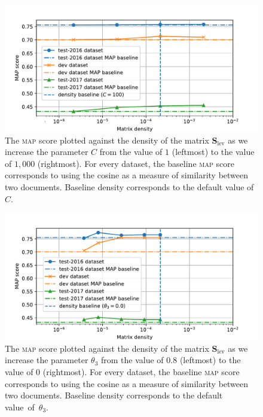 \documentclass[
  digital, %
  notable, %
  lof,     %
  lot,     %
  nopalatino, color
]{fithesis3}
\def\abbr#1{\textsc{\MakeLowercase{#1}}}
\begin{document}
\begin{figure}[p]
\centering%
\includegraphics[trim={0.6cm 0.1cm 1.5cm 1.0cm}, scale=0.75]{figs/fig4}
\caption[A \abbr{MAP}-density plot for matrix $\mathbf S_{\textrm{lev}}$
and parameter $C$]{The \abbr{MAP}\index{map@\protect\abbr{MAP}}
  score plotted against the density of the matrix $\mathbf S_{\textrm{lev}}$
   as we increase the parameter $C$
   from the value of $1$ (leftmost) to the value of $1{,}000$
  (rightmost). For every dataset, the baseline \abbr{MAP} score
  corresponds to using the cosine as a measure of similarity between two
  documents. Baseline density corresponds to the default value of~$C$.}
  \label{fig:similarity-fig4}
\end{figure}

\begin{figure}[p]
\centering%
\includegraphics[trim={0.6cm 0.1cm 1.5cm 1.0cm}, scale=0.75]{figs/fig5}
\caption[A \abbr{MAP}-density plot for matrix $\mathbf S_{\textrm{lev}}$
and parameter $\theta_3$]{The
  \abbr{MAP}\index{map@\protect\abbr{MAP}} score plotted against the density of
  the matrix $\mathbf S_{\textrm{lev}}$ 
  as we increase the parameter $\theta_3$ from
  the value of $0.8$ (leftmost) to the value of $0$ (rightmost). For every
  dataset, the baseline \abbr{MAP} score corresponds to using the cosine as a measure
  of similarity between two documents. Baseline density corresponds to the
  default value~of~$\theta_3$.}
  \label{fig:similarity-fig5}
\end{figure}
\end{document}

